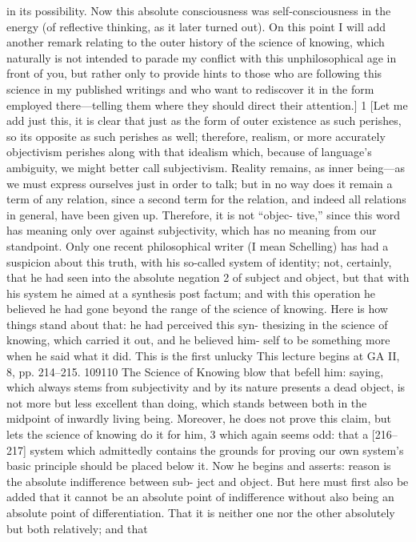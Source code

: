 in its possibility. Now this absolute consciousness was self-consciousness in the
energy (of reflective thinking, as it later turned out). On this point I will add
another remark relating to the outer history of the science of knowing, which
naturally is not intended to parade my conflict with this unphilosophical age in
front of you, but rather only to provide hints to those who are following this
science in my published writings and who want to rediscover it in the form
employed there—telling them where they should direct their attention.] 1
[Let me add just this, it is clear that just as the form of outer existence
as such perishes, so its opposite as such perishes as well; therefore, realism, or
more accurately objectivism perishes along with that idealism which, because
of language’s ambiguity, we might better call subjectivism. Reality remains, as
inner being—as we must express ourselves just in order to talk; but in no way
does it remain a term of any relation, since a second term for the relation, and
indeed all relations in general, have been given up. Therefore, it is not “objec-
tive,” since this word has meaning only over against subjectivity, which has no
meaning from our standpoint. Only one recent philosophical writer (I mean
Schelling) has had a suspicion about this truth, with his so-called system of
identity; not, certainly, that he had seen into the absolute negation 2 of subject
and object, but that with his system he aimed at a synthesis post factum; and
with this operation he believed he had gone beyond the range of the science
of knowing. Here is how things stand about that: he had perceived this syn-
thesizing in the science of knowing, which carried it out, and he believed him-
self to be something more when he said what it did. This is the first unlucky
This lecture begins at GA II, 8, pp. 214–215.
109110
The Science of Knowing
blow that befell him: saying, which always stems from subjectivity and by its
nature presents a dead object, is not more but less excellent than doing, which
stands between both in the midpoint of inwardly living being. Moreover, he
does not prove this claim, but lets the science of knowing do it for him, 3 which
again seems odd: that a [216–217] system which admittedly contains the
grounds for proving our own system’s basic principle should be placed below
it. Now he begins and asserts: reason is the absolute indifference between sub-
ject and object. But here must first also be added that it cannot be an absolute
point of indifference without also being an absolute point of differentiation.
That it is neither one nor the other absolutely but both relatively; and that
